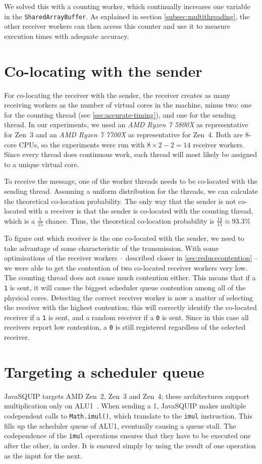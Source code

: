 \documentclass[11pt,
  titlepage=false,
]{scrreprt}
\begin{document}
We solved this with a counting worker, which continually increases one variable in the \texttt{SharedArrayBuffer}.
As explained in section \ref{subsec:multithreading}, the other receiver workers can then access this counter and use it to measure execution times with adequate accuracy.

\section{Co-locating with the sender}
\label{sec:co-location}
For co-locating the receiver with the sender, the receiver creates as many receiving workers as the number of virtual cores in the machine, minus two:
one for the counting thread (see \ref{sec:accurate-timing}), and one for the sending thread.
In our experiments, we used an \textit{AMD Ryzen 7 5800X} as representative for Zen~3 and an \textit{AMD Ryzen 7 7700X} as representative for Zen~4.
Both are 8-core CPUs, so the experiments were run with $8 \times 2 - 2 = 14$ receiver workers.
Since every thread does continuous work, each thread will most likely be assigned to a unique virtual core.

To receive the message, one of the worker threads needs to be co-located with the sending thread.
Assuming a uniform distribution for the threads, we can calculate the theoretical co-location probability.
The only way that the sender is not co-located with a receiver is that the sender is co-located with the counting thread,
which is a $\frac{1}{15}$ chance.
Thus, the theoretical co-location probability is $\frac{14}{15} \approx 93.3\%$

To figure out which receiver is the one co-located with the sender,
we need to take advantage of some characteristic of the transmission.
With some optimisations of the receiver workers -- described closer in \ref{sec:reducecontention} --
we were able to get the contention of two co-located receiver workers very low.
The counting thread does not cause much contention either.
This means that if a \texttt{1} is sent, it will cause the biggest scheduler queue contention among all of the physical cores.
Detecting the correct receiver worker is now a matter of selecting the receiver with the highest contention;
this will correctly identify the co-located receiver if a \texttt{1} is sent, and a random receiver if a \texttt{0} is sent.
Since in this case all receivers report low contention, a \texttt{0} is still registered regardless of the selected receiver.

\section{Targeting a scheduler queue}
JavaSQUIP targets AMD Zen~2, Zen~3 and Zen~4;
these architectures support multiplication only on ALU1~\cite{AMD2020OptimizationEPYC7003}.
When sending a 1, JavaSQUIP makes multiple codependent calls to \texttt{Math.imul()}, which translate to the \texttt{imul} instruction.
This fills up the scheduler queue of ALU1, eventually causing a queue stall.
The codependence of the \texttt{imul} operations ensures that they have to be executed one after the other, in order.
It is ensured simply by using the result of one operation as the input for the next.
\end{document}
